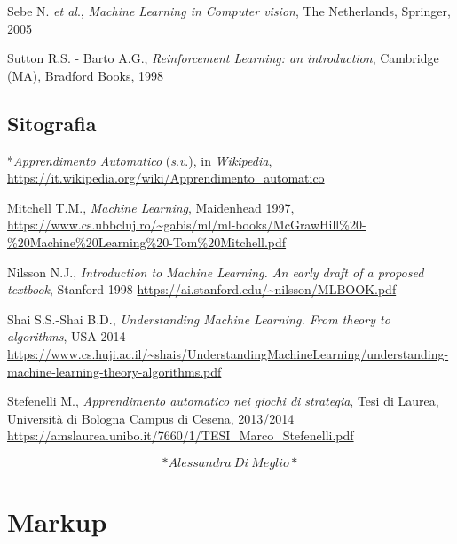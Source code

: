 \documentclass[
  b5paper,
  twoside,
  12pt,
  chapterprefix=false,
  bibliography=totocnumbered,
  parskip=false]{scrbook}
\begin{document}
Sebe N. \emph{et al}., \emph{Machine Learning in Computer vision}, The
Netherlands, Springer, 2005

Sutton R.S. - Barto A.G., \emph{Reinforcement Learning: an introduction},
Cambridge (MA), Bradford Books, 1998

\hypertarget{sitografia-21}{%
\section*{Sitografia}\label{sitografia-21}}

*\emph{Apprendimento Automatico} (\emph{s}.\emph{v}.), in \emph{Wikipedia},
\url{https://it.wikipedia.org/wiki/Apprendimento_automatico}

Mitchell T.M., \emph{Machine Learning}, Maidenhead 1997,
\url{https://www.cs.ubbcluj.ro/~gabis/ml/ml-books/McGrawHill\%20-\%20Machine\%20Learning\%20-Tom\%20Mitchell.pdf}

Nilsson N.J., \emph{Introduction to Machine Learning. An early draft of a
proposed textbook}, Stanford 1998
\url{https://ai.stanford.edu/~nilsson/MLBOOK.pdf}

Shai S.S.-Shai B.D., \emph{Understanding Machine Learning. From theory to
algorithms}, USA 2014
\url{https://www.cs.huji.ac.il/~shais/UnderstandingMachineLearning/understanding-machine-learning-theory-algorithms.pdf}

Stefenelli M., \emph{Apprendimento automatico nei giochi di strategia}, Tesi
di Laurea, Università di Bologna Campus di Cesena, 2013/2014
\url{https://amslaurea.unibo.it/7660/1/TESI_Marco_Stefenelli.pdf}

\[*Alessandra~Di~Meglio*\]

\hypertarget{markup}{%
\chapter{Markup}\label{markup}}
\end{document}
